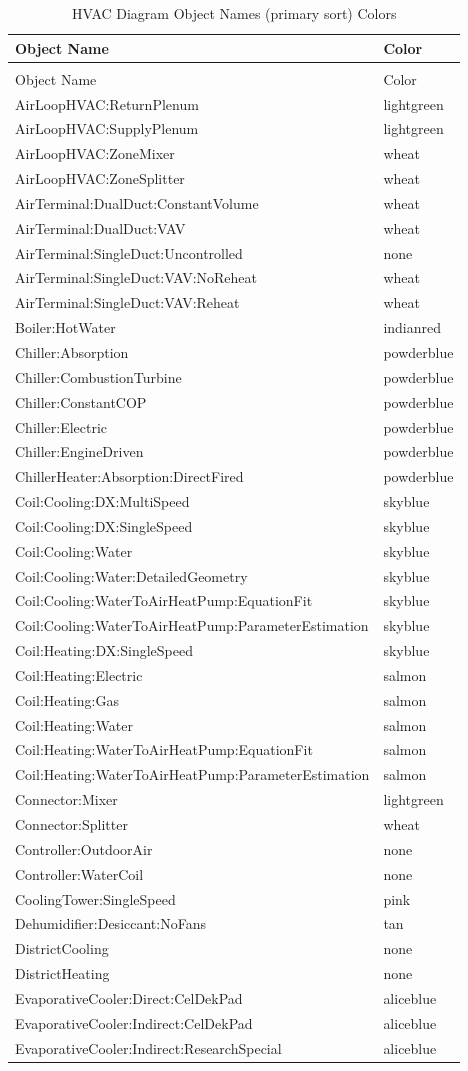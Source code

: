 \begin{longtable}[c]{@{}ll@{}}
\caption{HVAC Diagram Object Names (primary sort) Colors \label{table:hvac-diagram-object-names-primary-sort-colors}} \tabularnewline
\toprule 
Object Name & Color \tabularnewline \midrule
\endfirsthead

\caption[]{HVAC Diagram Object Names (primary sort) Colors} \tabularnewline
\toprule 
Object Name & Color \tabularnewline \midrule
\endhead

AirLoopHVAC:ReturnPlenum & lightgreen \tabularnewline
AirLoopHVAC:SupplyPlenum & lightgreen \tabularnewline
AirLoopHVAC:ZoneMixer & wheat \tabularnewline
AirLoopHVAC:ZoneSplitter & wheat \tabularnewline
AirTerminal:DualDuct:ConstantVolume & wheat \tabularnewline
AirTerminal:DualDuct:VAV & wheat \tabularnewline
AirTerminal:SingleDuct:Uncontrolled & none \tabularnewline
AirTerminal:SingleDuct:VAV:NoReheat & wheat \tabularnewline
AirTerminal:SingleDuct:VAV:Reheat & wheat \tabularnewline
Boiler:HotWater & indianred \tabularnewline
Chiller:Absorption & powderblue \tabularnewline
Chiller:CombustionTurbine & powderblue \tabularnewline
Chiller:ConstantCOP & powderblue \tabularnewline
Chiller:Electric & powderblue \tabularnewline
Chiller:EngineDriven & powderblue \tabularnewline
ChillerHeater:Absorption:DirectFired & powderblue \tabularnewline
Coil:Cooling:DX:MultiSpeed & skyblue \tabularnewline
Coil:Cooling:DX:SingleSpeed & skyblue \tabularnewline
Coil:Cooling:Water & skyblue \tabularnewline
Coil:Cooling:Water:DetailedGeometry & skyblue \tabularnewline
Coil:Cooling:WaterToAirHeatPump:EquationFit & skyblue \tabularnewline
Coil:Cooling:WaterToAirHeatPump:ParameterEstimation & skyblue \tabularnewline
Coil:Heating:DX:SingleSpeed & skyblue \tabularnewline
Coil:Heating:Electric & salmon \tabularnewline
Coil:Heating:Gas & salmon \tabularnewline
Coil:Heating:Water & salmon \tabularnewline
Coil:Heating:WaterToAirHeatPump:EquationFit & salmon \tabularnewline
Coil:Heating:WaterToAirHeatPump:ParameterEstimation & salmon \tabularnewline
Connector:Mixer & lightgreen \tabularnewline
Connector:Splitter & wheat \tabularnewline
Controller:OutdoorAir & none \tabularnewline
Controller:WaterCoil & none \tabularnewline
CoolingTower:SingleSpeed & pink \tabularnewline
Dehumidifier:Desiccant:NoFans & tan \tabularnewline
DistrictCooling & none \tabularnewline
DistrictHeating & none \tabularnewline
EvaporativeCooler:Direct:CelDekPad & aliceblue \tabularnewline
EvaporativeCooler:Indirect:CelDekPad & aliceblue \tabularnewline
EvaporativeCooler:Indirect:ResearchSpecial & aliceblue \tabularnewline

\end{longtable}
